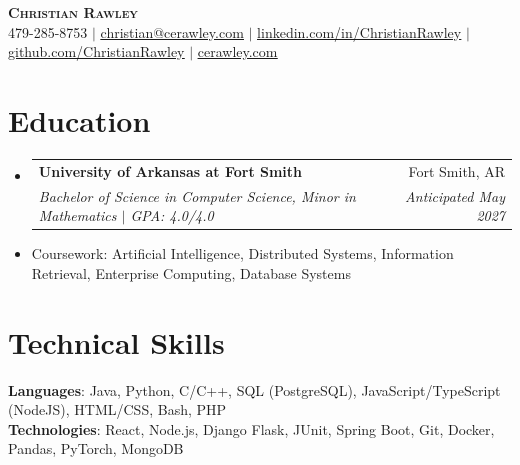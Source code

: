 \documentclass[letterpaper,11pt]{article}
\makeatletter
\newcommand{\resumeItem}[1]{
  \item\small{
    {#1 \vspace{-2pt}}
  }
}
\newcommand{\resumeSubheading}[4]{
  \vspace{-2pt}\item
    \begin{tabular*}{0.97\textwidth}[t]{l@{\extracolsep{\fill}}r}
      \textbf{#1} & #2 \\
      \textit{\small#3} & \textit{\small #4} \\
    \end{tabular*}\vspace{-7pt}
}
\newcommand{\resumeSubHeadingListStart}{\begin{itemize}[leftmargin=0.0in, label={}]}
\newcommand{\resumeSubHeadingListEnd}{\end{itemize}}
\makeatother
\begin{document}

\begin{center}
    \textbf{\Huge \scshape Christian Rawley} \\ \vspace{1pt}
    \small 479-285-8753 $|$ \href{mailto:christian@cerawley.com}{\underline{christian@cerawley.com}} $|$ 
    \href{https://linkedin.com/in/ChristianRawley}{\underline{linkedin.com/in/ChristianRawley}} $|$
    \href{https://github.com/ChristianRawley}{\underline{github.com/ChristianRawley}} $|$
    \href{https://www.cerawley.com}{\underline{cerawley.com}}
\end{center}


\section{Education}
  \resumeSubHeadingListStart
    \resumeSubheading
      {University of Arkansas at Fort Smith}{Fort Smith, AR}
      {Bachelor of Science in Computer Science, Minor in Mathematics $|$ GPA: 4.0/4.0}{Anticipated May 2027}
        \resumeItem{Coursework: Artificial Intelligence, Distributed Systems, Information Retrieval, Enterprise Computing, Database Systems}
  \resumeSubHeadingListEnd

\section{Technical Skills}
 \begin{itemize}[leftmargin=0.0in, label={}]
    \small{\item{
     \textbf{Languages}{: Java, Python, C/C++, SQL (PostgreSQL), JavaScript/TypeScript (NodeJS), HTML/CSS, Bash, PHP} \\
     \textbf{Technologies}{: React, Node.js, Django Flask, JUnit, Spring Boot, Git, Docker, Pandas, PyTorch, MongoDB} 
    }}
 \end{itemize}

\end{document}
